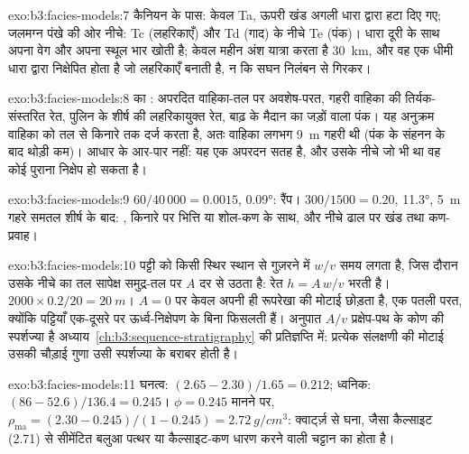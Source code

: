 \begin{solution}{exo:b3:facies-models:7}
कैनियन के पास: केवल Ta, ऊपरी खंड अगली धारा द्वारा हटा दिए गए; जलमग्न पंखे
की ओर नीचे: Tc (लहरिकाएँ) और Td (गाद) के नीचे Te (पंक)। धारा दूरी के साथ
अपना वेग और अपना स्थूल भार खोती है; केवल महीन अंश यात्रा करता है
\qty{30}{km}, और वह एक धीमी धारा द्वारा निक्षेपित होता है जो लहरिकाएँ बनाती है,
न कि सघन निलंबन से गिरकर।
\end{solution}

\begin{solution}{exo:b3:facies-models:8}
 का : अपरदित वाहिका-तल पर अवशेष-परत,
गहरी वाहिका की तिर्यक-संस्तरित रेत, पुलिन के शीर्ष की लहरिकायुक्त रेत,
बाढ़ के मैदान का जड़ों वाला पंक। यह अनुक्रम वाहिका को तल से
किनारे तक दर्ज करता है, अतः वाहिका लगभग \qty{9}{m} गहरी थी (पंक के संहनन के बाद
थोड़ी कम)। आधार के आर-पार नहीं: यह एक अपरदन सतह है, और
उसके नीचे जो भी था वह कोई पुराना निक्षेप हो सकता है।
\end{solution}

\begin{solution}{exo:b3:facies-models:9}
$60/40\,000 = 0.0015$, \ang{0.09}: रैंप। $300/1500 = 0.20$, \ang{11.3},
\qty{5}{m} गहरे समतल शीर्ष के बाद: , किनारे पर भित्ति या शोल-कण
के साथ, और नीचे ढाल पर खंड तथा कण-प्रवाह।
\end{solution}

\begin{solution}{exo:b3:facies-models:10}
पट्टी को किसी स्थिर स्थान से गुज़रने में $w/v$ समय लगता है, जिस दौरान
उसके नीचे का तल सापेक्ष समुद्र-तल पर $A$ दर से उठता है: रेत $h = A\,w/v$ भरती है।
$2000\times0.2/20 = \qty{20}{m}$। $A = 0$ पर  केवल
अपनी ही रूपरेखा की मोटाई छोड़ता है, एक पतली परत, क्योंकि पट्टियाँ एक-दूसरे पर
ऊर्ध्व-निक्षेपण के बिना फिसलती हैं। अनुपात $A/v$ प्रक्षेप-पथ के कोण की स्पर्शज्या है
अध्याय~\ref{ch:b3:sequence-stratigraphy} की प्रतिज्ञप्ति में: प्रत्येक संलक्षणी की मोटाई
उसकी चौड़ाई गुणा उसी स्पर्शज्या के बराबर होती है।
\end{solution}

\begin{solution}{exo:b3:facies-models:11}
घनत्व: $(2.65 - 2.30)/1.65 = 0.212$; ध्वनिक: $(86 - 52.6)/136.4 = 0.245$।
$\phi = 0.245$ मानने पर, $\rho_{\mathrm{ma}} = (2.30 - 0.245)/(1 - 0.245) =
\qty{2.72}{g/cm^3}$: क्वार्ट्ज़ से घना, जैसा कैल्साइट (2.71) से सीमेंटित
बलुआ पत्थर या कैल्साइट-कण धारण करने वाली चट्टान का होता है।
\end{solution}

